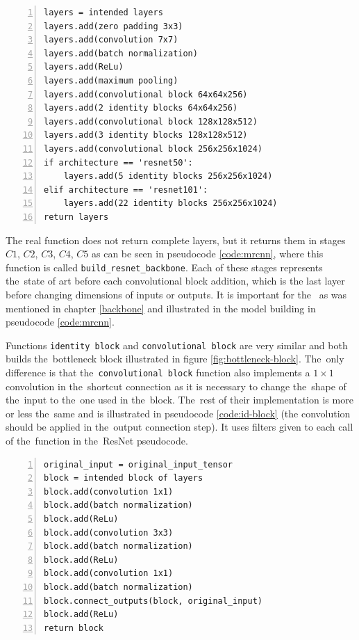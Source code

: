 {\scriptsize
\begin{lstlisting}[style=python, caption={Building the~ResNet backbone 
architecture}, captionpos=b, label=code:resnet, deletekeywords={from, max},
backgroundcolor = \color{light-gray}, numbers=left, breaklines=true]
layers = intended layers
layers.add(zero padding 3x3)
layers.add(convolution 7x7)
layers.add(batch normalization)
layers.add(ReLu)
layers.add(maximum pooling)
layers.add(convolutional block 64x64x256)
layers.add(2 identity blocks 64x64x256)
layers.add(convolutional block 128x128x512)
layers.add(3 identity blocks 128x128x512)
layers.add(convolutional block 256x256x1024)
if architecture == 'resnet50':
    layers.add(5 identity blocks 256x256x1024)
elif architecture == 'resnet101':
    layers.add(22 identity blocks 256x256x1024)
return layers
\end{lstlisting}}

The real function does not return complete layers, but it returns them in stages 
$C1$, $C2$, $C3$, $C4$, $C5$ as can be seen in pseudocode \ref{code:mrcnn}, 
where this function is called \verb|build_resnet_backbone|. Each of these stages 
represents the~state of art before each convolutional block addition, which is 
the last layer before changing dimensions of inputs or outputs. It is important 
for the~ as was mentioned in chapter \ref{backbone} and illustrated in 
the model building in pseudocode \ref{code:mrcnn}.

Functions \verb|identity block| and \verb|convolutional block| are very similar 
and both builds the~bottleneck block illustrated in figure \ref{fig:bottleneck-block}.
The~only difference is that the~\verb|convolutional block| function also implements 
a $1 \times 1$ convolution in the~shortcut connection as it is necessary to 
change the~shape of the~input to the~one used in the~block. The~rest of their 
implementation is more or less the~same and is illustrated in pseudocode 
\ref{code:id-block} (the convolution should be applied in the~output connection 
step). It uses filters given to each call of the~function in the~ResNet 
pseudocode.

{\scriptsize
\begin{lstlisting}[style=python, caption={identity\_block}, captionpos=b, 
label=code:id-block, deletekeywords={from, input},
backgroundcolor = \color{light-gray}, numbers=left, breaklines=true]
original_input = original_input_tensor
block = intended block of layers
block.add(convolution 1x1)
block.add(batch normalization)
block.add(ReLu)
block.add(convolution 3x3)
block.add(batch normalization)
block.add(ReLu)
block.add(convolution 1x1)
block.add(batch normalization)
block.connect_outputs(block, original_input)
block.add(ReLu)
return block
\end{lstlisting}}

